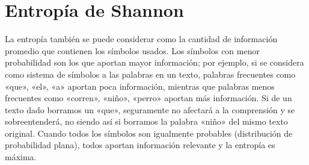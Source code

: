 \chapter{Entropía de Shannon}
La entropía también se puede considerar como la cantidad de información promedio que contienen los símbolos usados. Los símbolos con menor probabilidad son los que aportan mayor información; por ejemplo, si se considera como sistema de símbolos a las palabras en un texto, palabras frecuentes como «que», «el», «a» aportan poca información, mientras que palabras menos frecuentes como «corren», «niño», «perro» aportan más información. Si de un texto dado borramos un «que», seguramente no afectará a la comprensión y se sobreentenderá, no siendo así si borramos la palabra «niño» del mismo texto original. Cuando todos los símbolos son igualmente probables (distribución de probabilidad plana), todos aportan información relevante y la entropía es máxima. 

